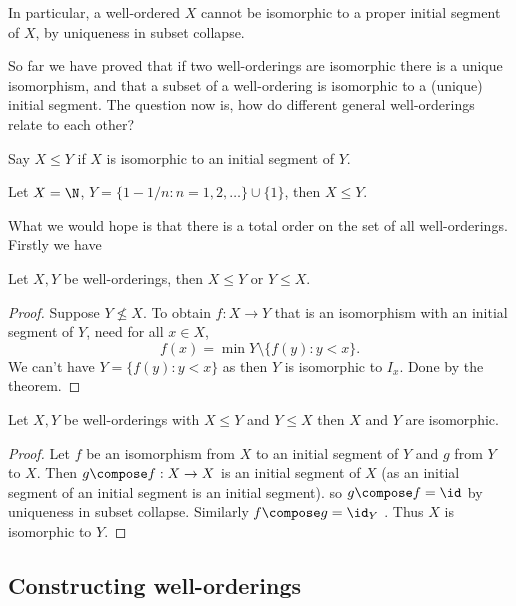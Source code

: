 \documentclass[a4paper]{article}
\begin{document}
In particular, a well-ordered \(X\) cannot be isomorphic to a proper initial segment of \(X\), by uniqueness in subset collapse.

So far we have proved that if two well-orderings are isomorphic there is a unique isomorphism, and that a subset of a well-ordering is isomorphic to a (unique) initial segment. The question now is, how do different general well-orderings relate to each other?

\begin{definition}
  Say \(X \leq Y\) if \(X\) is isomorphic to an initial segment of \(Y\).
\end{definition}

\begin{eg}
  Let \(X = \N\), \(Y = \{1 - 1/n: n = 1, 2, \dots\} \cup \{1\}\), then \(X \leq Y\).
\end{eg}

What we would hope is that there is a total order on the set of all well-orderings. Firstly we have

\begin{theorem}
  Let \(X, Y\) be well-orderings, then \(X \leq Y\) or \(Y \leq X\).
\end{theorem}

\begin{proof}
  Suppose \(Y \nleq X\). To obtain \(f: X \to Y\) that is an isomorphism with an initial segment of \(Y\), need for all \(x \in X\),
  \[
    f(x) = \min Y \setminus \{f(y): y < x\}.
  \]
  We can't have \(Y = \{f(y): y < x\}\) as then \(Y\) is isomorphic to \(I_x\). Done by the theorem.
\end{proof}

\begin{proposition}
  Let \(X, Y\) be well-orderings with \(X \leq Y\) and \(Y \leq X\) then \(X\) and \(Y\) are isomorphic.
\end{proposition}

\begin{proof}
  Let \(f\) be an isomorphism from \(X\) to an initial segment of \(Y\) and \(g\) from \(Y\) to \(X\). Then \(g \compose f: X \to X\) is an initial segment of \(X\) (as an initial segment of an initial segment is an initial segment). so \(g \compose f = \id\) by uniqueness in subset collapse. Similarly \(f \compose g = \id_Y\) . Thus \(X\) is isomorphic to \(Y\).
\end{proof}

\subsection{Constructing well-orderings}
\end{document}
